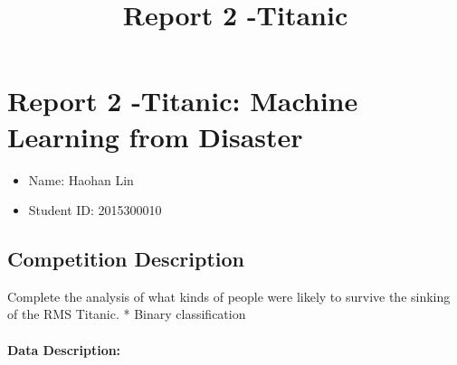 \documentclass[11pt]{article}
\title{Report 2 -Titanic}
\providecommand{\tightlist}{%
      \setlength{\itemsep}{0pt}\setlength{\parskip}{0pt}}
\begin{document}
    
    
    \maketitle
    
    

    
    \section{Report 2 -Titanic: Machine Learning from
Disaster}\label{report-2--titanic-machine-learning-from-disaster}

    \begin{itemize}
\tightlist
\item
  Name: Haohan Lin
\item
  Student ID: 2015300010
\end{itemize}

    \subsection{Competition Description}\label{competition-description}

Complete the analysis of what kinds of people were likely to survive the
sinking of the RMS Titanic. * Binary classification

    \paragraph{Data Description:}\label{data-description}
\end{document}
